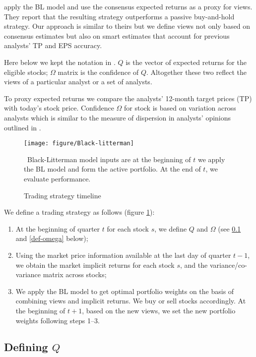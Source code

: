 \documentclass{book}
\begin{document}
\cite{da2011bl} apply the BL model and use the consensus expected returns as a proxy for views. They report that the resulting strategy outperforms a passive buy-and-hold strategy. Our approach is similar to theirs but we define views not only based on consensus estimates but also on smart estimates that account for previous analysts' TP and EPS accuracy.

Here below we kept the notation in \cite{black1992}.  $Q$ is the vector of  expected returns for the eligible stocks; $\Omega$ matrix is the confidence of $Q$. Altogether these two reflect the views of a particular analyst or a set of analysts.

To proxy expected returns we compare the analysts' 12-month target prices (TP) with today's stock price. Confidence $\Omega$ for stock is based on variation  across analysts which is similar to the measure of dispersion in analysts' opinions outlined in \cite{diether2002}.

\begin{figure}
\begin{center}
\texttt{[image: figure/Black-litterman]}
\end{center}
\caption{Trading strategy timeline}
\label{fig:bl}
\ Black-Litterman model inputs are at the beginning of $t$ we apply the BL model and form the active portfolio. At the end of $t$, we evaluate performance.
\end{figure}



We define a trading strategy as follows (figure \ref{fig:bl}):
\begin{enumerate}
\item  At the beginning of quarter $t$ for each stock $s$,   we define $Q$ and $\Omega$ (see \ref{def-q} and \ref{def-omega} below);

\item Using the market price information available at the last day of quarter $t-1$, we obtain the market implicit returns for each stock $s$,  and the variance/co-variance matrix across stocks;

\item We apply the BL model to get  optimal portfolio weights on the basis of combining views and implicit returns. We  buy or sell stocks accordingly. At the beginning of $t+1$, based on the new views, we set the new portfolio weights following  steps 1--3.
\end{enumerate}

\subsection{Defining $Q$}
\label{def-q}
\end{document}
